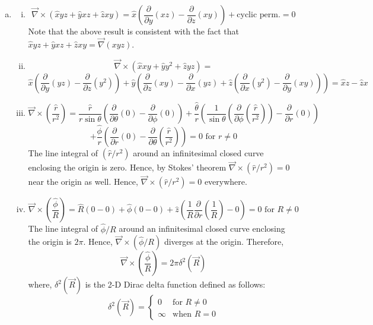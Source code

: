\documentclass{esg8022pset}
\newcommand{\dx}{\frac{\partial}{\partial x}}
\newcommand{\dy}{\frac{\partial}{\partial y}}
\newcommand{\dz}{\frac{\partial}{\partial z}}
\newcommand{\dtheta}{\frac{\partial}{\partial \theta}}
\newcommand{\dr}{\frac{\partial}{\partial r}}
\begin{document}
\begin{solution}
\begin{enumerate}[(a)]
\begin{enumerate}[(i)]
      \end{enumerate}
    \item
      \begin{enumerate}[(i)]
        \item  $${\vec{\nabla} \times \left( \hat{x} yz + \hat{y} xz + \hat{z} xy \right)} = \hat x\left( \dy\left( xz \right) - \dz(xy) \right) + \text{cyclic perm.} =0 $$
          Note that the above result is consistent with the fact that $\hat{x} yz + \hat{y} xz + \hat{z} xy = \vec{\nabla} (xyz)$.
        \item $$ {\vec{\nabla} \times \left( \hat{x} xy + \hat{y} y^2 + \hat{z} yz \right)} =$$ $$\hat x\left( \dy(yz) - \dz(y^2) \right) + \hat y\left( \dz(xy) - \dx(yz) + \hat z\left( \dx(y^2) - \dy(xy) \right)\right) = \hat x z - \hat z x$$
        \item $${\vec{\nabla} \times \left( \frac{\hat r}{r^2} \right)} = \frac{\hat r}{r \sin \theta} \left( \dtheta \left( 0 \right) - \frac{\partial}{\partial \phi} \left( 0 \right)\right) + \frac{\hat\theta}{r} \left( \frac{1}{\sin \theta} \left( \frac{\partial}{\partial \phi} \left(\frac{\hat r}{r^2} \right) \right)-   \dr \left( 0 \right) \right)$$ $$+  \frac{\hat\phi}{r} \left( \dr \left( 0 \right) - \dtheta \left( \frac{\hat r}{r^2}\right) \right) = 0\text{ for }r \neq 0$$
          The line integral of $\left( \hat r / r^2 \right)$ around an infinitesimal closed curve enclosing the origin is zero. Hence, by Stokes' theorem $\vec{\nabla}\times\left({\hat r/r^2}\right) = 0$ near the origin as well. Hence, ${\vec{\nabla} \times \left( { \hat r / r^2} \right)} = 0$ everywhere.
        \item $${\vec{\nabla} \times \left( \frac{ \hat\phi}{R} \right)} = \hat{R} \left( 0 -0 \right) + \hat\phi \left( 0 - 0\right) + \hat z \left( \frac{1}{R} \dr \left( \frac{1}{R} \right) - 0 \right) = 0\text{ for }R \neq 0 $$
          The line integral  of ${ \hat\phi / R} $ around an infinitesimal closed curve enclosing the origin is $2\pi$. Hence, ${\vec{\nabla} \times \left( { \hat\phi / R} \right)}$ diverges at the origin. Therefore, 
          $${\vec{\nabla} \times \left( \frac{ \hat\phi}{R} \right)} = 2\pi \delta^2(\vec{R}) $$
          where, $\delta^2(\vec{R})$ is the 2-D Dirac delta function defined as follows:
          $$ \delta^2(\vec{R}) = \begin{cases} 0 & \text{for }R \neq  0 \\ \infty & \text{when }R = 0 \end{cases}$$

\end{enumerate}
\end{enumerate}
\end{solution}
\end{document}

